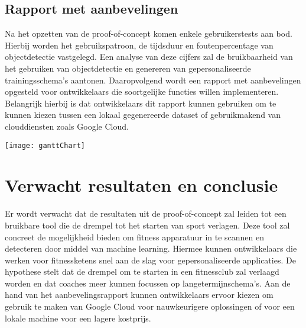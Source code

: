 \subsection{Rapport met aanbevelingen}
\label{subsec:result-of-poc}
Na het opzetten van de proof-of-concept komen enkele gebruikerstests aan bod. %
Hierbij worden het gebruikspatroon, de tijdsduur en foutenpercentage van objectdetectie vastgelegd.
Een analyse van deze cijfers zal de bruikbaarheid van het gebruiken van objectdetectie en genereren van gepersonaliseerde trainingsschema's aantonen.
Daaropvolgend wordt een rapport met aanbevelingen opgesteld voor ontwikkelaars die soortgelijke functies willen implementeren.
Belangrijk hierbij is dat ontwikkelaars dit rapport kunnen gebruiken om te kunnen kiezen tussen een lokaal gegenereerde dataset of gebruikmakend van clouddiensten zoals Google Cloud.

\texttt{[image: ganttChart]}

\section{Verwacht resultaten en conclusie}
\label{sec:verwacht-resultaten-en-conclusie}
Er wordt verwacht dat de resultaten uit de proof-of-concept zal leiden tot een bruikbare tool die de drempel tot het starten van sport verlagen.
Deze tool zal concreet de mogelijkheid bieden om fitness apparatuur in te scannen en detecteren door middel van machine learning.
Hiermee kunnen ontwikkelaars die werken voor fitnessketens snel aan de slag voor gepersonaliseerde applicaties.
De hypothese stelt dat de drempel om te starten in een fitnessclub zal verlaagd worden en dat coaches meer kunnen focussen op langetermijnschema's.
Aan de hand van het aanbevelingsrapport kunnen ontwikkelaars ervoor kiezen om gebruik te maken van Google Cloud voor nauwkeurigere oplossingen of voor een lokale machine voor een lagere kostprijs.